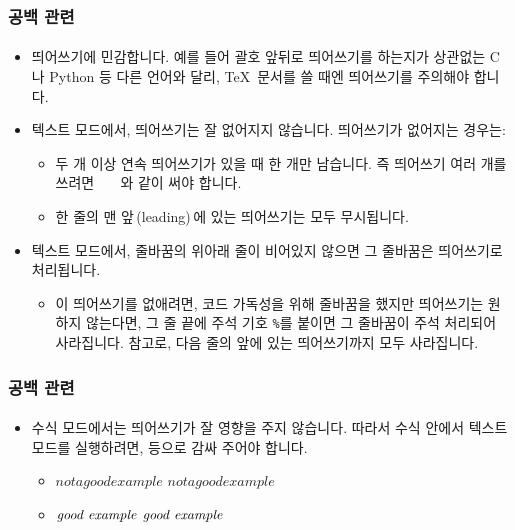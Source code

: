   \begin{frame}[fragile]
    \frametitle{공백 관련}
    \framesubtitle{}
    \begin{itemize}
      \item<1->  띄어쓰기에 민감합니다. 예를 들어 괄호 앞뒤로 띄어쓰기를 하는지가 상관없는 C나 Python 등 다른 언어와 달리, \TeX\ 문서를 쓸 때엔 띄어쓰기를 주의해야 합니다.
      \item<2-> 텍스트 모드에서, 띄어쓰기는 잘 없어지지 않습니다. 띄어쓰기가 없어지는 경우는:
      \begin{itemize}
        \item 두 개 이상 연속 띄어쓰기가 있을 때 한 개만 남습니다. 즉 띄어쓰기 여러 개를 쓰려면 \texttt{\ \ \ }와 같이 써야 합니다.
        \item 한 줄의 맨 앞{\,\small(leading)\normalsize\,}에 있는 띄어쓰기는 모두 무시됩니다.
      \end{itemize}
      \item<3-> 텍스트 모드에서, 줄바꿈의 위아래 줄이 비어있지 않으면 그 줄바꿈은 띄어쓰기로 처리됩니다.
      \begin{itemize}
        \item 이 띄어쓰기를 없애려면, 코드 가독성을 위해 줄바꿈을 했지만 띄어쓰기는 원하지 않는다면, 그 줄 끝에 주석 기호 \texttt{\%}를 붙이면 그 줄바꿈이 주석 처리되어 사라집니다. 참고로, 다음 줄의 앞에 있는 띄어쓰기까지 모두 사라집니다.
      \end{itemize}
    \end{itemize}
  \end{frame}


  \begin{frame}[fragile]
    \frametitle{공백 관련}
    \framesubtitle{}
    \begin{itemize}
      \item 수식 모드에서는 띄어쓰기가 잘 영향을 주지 않습니다. 따라서 수식 안에서 텍스트 모드를 실행하려면, \texttt{} 등으로 감싸 주어야 합니다.
      \begin{itemize}
        \item \texttt{$not a good example$} $not a good example$
        \item \texttt{$\textrm{\textit{good example}}$} $\textrm{\textit{good example}}$
      \end{itemize}
    \end{itemize}
  \end{frame}
    
